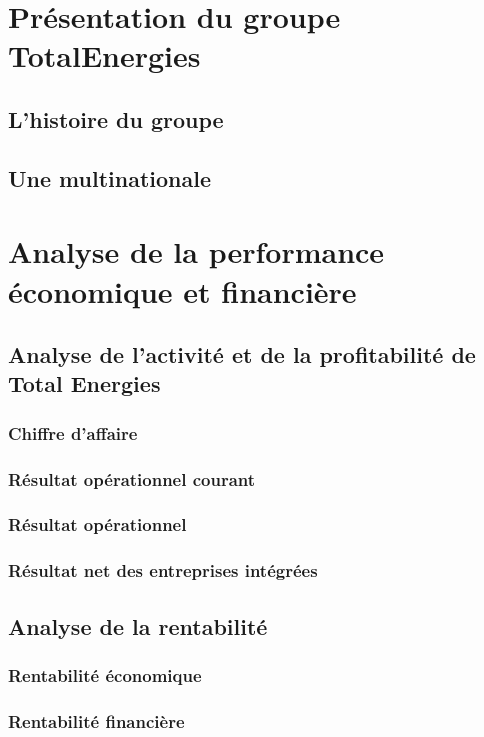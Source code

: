 \documentclass[12pt]{article}
\begin{document}
\pagestyle{fancy}
\fancyhead{}
\fancyhead[L]{\leftmark}
\fancyfoot{} 

\section{Présentation du groupe TotalEnergies}
\subsection{L'histoire du groupe}
\subsection{Une multinationale}

\section{Analyse de la performance économique et financière}
\subsection{Analyse de l'activité et de la profitabilité de Total Energies}
\subsubsection{Chiffre d'affaire}
\subsubsection{Résultat opérationnel courant}
\subsubsection{Résultat opérationnel}
\subsubsection{Résultat net des entreprises intégrées}

\subsection{Analyse de la rentabilité}
\subsubsection{Rentabilité économique}
\subsubsection{Rentabilité financière}
\end{document}
